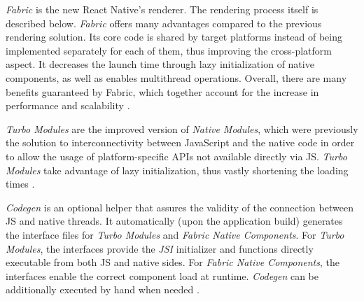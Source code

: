 \emph{Fabric} is the new React Native's renderer. The rendering process itself is described below. \emph{Fabric} offers many advantages compared to the previous rendering solution. Its core code is shared by target platforms instead of being implemented separately for each of them, thus improving the cross-platform aspect. It decreases the launch time through lazy initialization of native components, as well as enables multithread operations. Overall, there are many benefits guaranteed by Fabric, which together account for the increase in performance and scalability \cite{react_native_docs_fabric}.

\emph{Turbo Modules} are the improved version of \emph{Native Modules}, which were previously the solution to interconnectivity between JavaScript and the native code in order to allow the usage of platform-specific APIs not available directly via JS. \emph{Turbo Modules} take advantage of lazy initialization, thus vastly shortening the loading times \cite{react_native_docs_turbo_modules}.

\emph{Codegen} is an optional helper that assures the validity of the connection between JS and native threads. It automatically (upon the application build) generates the interface files for \emph{Turbo Modules} and \emph{Fabric Native Components}. For \emph{Turbo Modules}, the interfaces provide the \emph{JSI} initializer and functions directly executable from both JS and native sides. For \emph{Fabric Native Components}, the interfaces enable the correct component load at runtime. \emph{Codegen} can be additionally executed by hand when needed \cite{react_native_docs_codegen}.

